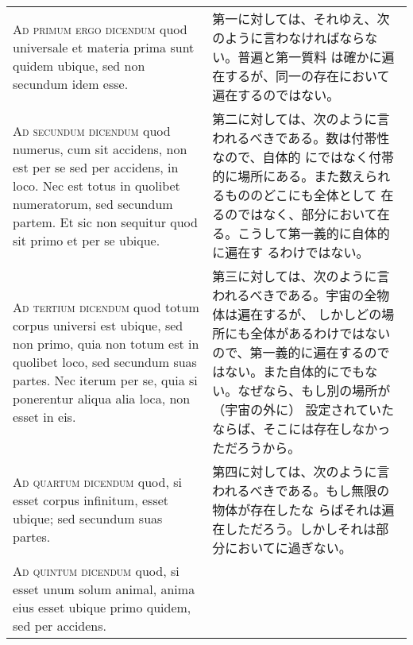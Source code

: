 \documentclass[10pt]{jsarticle} %
\begin{document}
\begin{longtable}{p{21em}p{21em}}
\\

{\scshape Ad primum ergo dicendum} quod universale et materia prima sunt
 quidem ubique, sed non secundum idem esse.

&

第一に対しては、それゆえ、次のように言わなければならない。普遍と第一質料
 は確かに遍在するが、同一の存在において遍在するのではない。

\\


{\scshape Ad secundum dicendum} quod numerus, cum sit accidens, non est per se
 sed per accidens, in loco. Nec est totus in quolibet numeratorum, sed
 secundum partem. Et sic non sequitur quod sit primo et per se ubique.

&

第二に対しては、次のように言われるべきである。数は付帯性なので、自体的
 にではなく付帯的に場所にある。また数えられるもののどこにも全体として
 在るのではなく、部分において在る。こうして第一義的に自体的に遍在す
 るわけではない。

\\


{\scshape Ad tertium dicendum} quod totum corpus universi est ubique, sed non
 primo, quia non totum est in quolibet loco, sed secundum suas
 partes. Nec iterum per se, quia si ponerentur aliqua alia loca, non
 esset in eis.

&

第三に対しては、次のように言われるべきである。宇宙の全物体は遍在するが、
 しかしどの場所にも全体があるわけではないので、第一義的に遍在するので
 はない。また自体的にでもない。なぜなら、もし別の場所が（宇宙の外に）
 設定されていたならば、そこには存在しなかっただろうから。

\\

{\scshape Ad quartum dicendum} quod, si esset corpus infinitum, esset ubique;
 sed secundum suas partes.

&

第四に対しては、次のように言われるべきである。もし無限の物体が存在したな
 らばそれは遍在しただろう。しかしそれは部分においてに過ぎない。

\\



{\scshape Ad quintum dicendum} quod, si esset unum solum animal, anima eius
 esset ubique primo quidem, sed per accidens.

&


\end{longtable}
\end{document}
